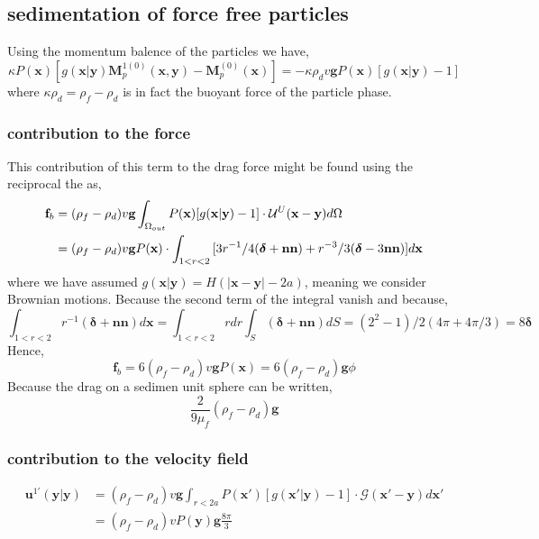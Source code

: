 \documentclass[12pt]{My_preprint}
\begin{document}
\subsection{sedimentation of force free particles}
Using the momentum balence of the particles we have, 
\begin{equation}
    \kappa P(\textbf{x})[g(\textbf{x}|\textbf{y})\textbf{M}_{p}^{1(0)}(\textbf{x},\textbf{y}) -\textbf{M}_{p}^{(0)}(\textbf{x})]
    =
    - \kappa \rho_d v \textbf{g} P(\textbf{x}) [g(\textbf{x}|\textbf{y}) - 1]
\end{equation}
where $\kappa\rho_d = \rho_f-\rho_d$ is in fact the buoyant force of the particle phase. 
\subsubsection*{contribution to the force}
This contribution of this term to the drag force might be found using the reciprocal the as, 
\begin{align}
    \textbf{f}_b 
    &= 
    (\rho_f -\rho_d) v \textbf{g}  
    \intO[out]{  P(\textbf{x}) [g(\textbf{x}|\textbf{y}) - 1] \cdot \mathcal{U}^U(\textbf{x}-\textbf{y})}\\
    &=
    (\rho_f -\rho_d) v \textbf{g}  P(\textbf{x})\cdot
    \int_{1 < r< 2}{  [3r^{-1}/4  (\bm\delta + \textbf{nn}) + r^{-3}/3 (\bm\delta - 3\textbf{nn})]  }d\textbf{x}
\end{align}
where we have assumed $g(\textbf{x}|\textbf{y}) = H(|\textbf{x}-\textbf{y}|-2a)$, meaning we consider Brownian motions. 
Because the second term of the integral vanish and because, 
\begin{equation}
    \int_{1<r<2} 
    r^{-1}(\bm\delta + \textbf{nn}) d\textbf{x}
    =
    \int_{1<r<2} 
    r dr 
    \int_S (\bm\delta + \textbf{nn}) dS
    =
    (2^2 - 1)/2 (4\pi + 4\pi/3)
    =
    8\bm\delta
\end{equation}
Hence, 
\begin{equation}
    \textbf{f}_b 
    =
    6 (\rho_f -\rho_d) v \textbf{g}  P(\textbf{x}) 
    =
    6 (\rho_f -\rho_d)  \textbf{g}  \phi
\end{equation}
Because the drag on a sedimen unit sphere can be written,
\begin{equation}
    \frac{2}{9\mu_f}(\rho_f - \rho_d)\textbf{g}
\end{equation}
\subsubsection*{contribution to the velocity field}
\begin{align}
    \textbf{u}^{1'}(\textbf{y}|\textbf{y}) 
    &= 
    (\rho_f -\rho_d) v \textbf{g}  
    \int_{r<2a}{  P(\textbf{x}') [g(\textbf{x}'|\textbf{y}) - 1] \cdot \mathcal{G}(\textbf{x}'-\textbf{y})}d\textbf{x}'\\
    &= 
    (\rho_f -\rho_d) v P(\textbf{y}) \textbf{g}  
    \frac{8\pi}{3}
\end{align}
\end{document}
